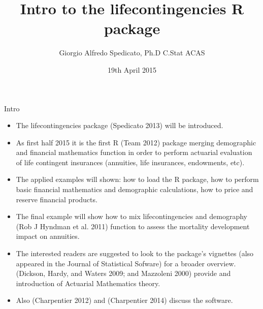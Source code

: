 \documentclass[ignorenonframetext,]{beamer}
\title{Intro to the lifecontingencies R package}
\author{Giorgio Alfredo Spedicato, Ph.D C.Stat ACAS}
\date{19th April 2015}
\begin{document}
\frame{\titlepage}

\begin{frame}
\tableofcontents[hideallsubsections]
\end{frame}

\begin{frame}

\end{frame}

\begin{frame}{Intro}

\begin{itemize}[<+->]
\itemsep1pt\parskip0pt
\item
  The lifecontingencies package (Spedicato 2013) will be introduced.
\item
  As first half 2015 it is the first R (Team 2012) package merging
  demographic and financial mathematics function in order to perform
  actuarial evaluation of life contingent insurances (annuities, life
  insurances, endowments, etc).
\item
  The applied examples will shown: how to load the R package, how to
  perform basic financial mathematics and demographic calculations, how
  to price and reserve financial products.
\end{itemize}

\end{frame}

\begin{frame}

\begin{itemize}[<+->]
\itemsep1pt\parskip0pt
\item
  The final example will show how to mix lifecontingencies and
  demography (Rob J Hyndman et al. 2011) function to assess the
  mortality development impact on annuities.
\item
  The interested readers are suggested to look to the package's
  vignettes (also appeared in the Journal of Statistical Sofware) for a
  broader overview. (Dickson, Hardy, and Waters 2009; and Mazzoleni
  2000) provide and introduction of Actuarial Mathematics theory.
\item
  Also (Charpentier 2012) and (Charpentier 2014) discuss the software.
\end{itemize}

\end{frame}
\end{document}
